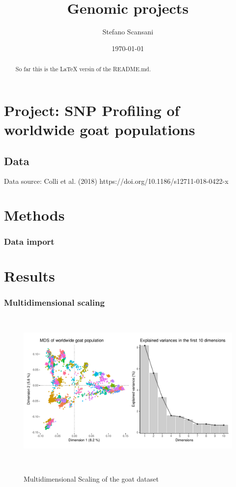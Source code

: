 \documentclass[a4paper,onecolumn,10pt]{article}
\begin{document}
\title{Genomic projects}
\author{Stefano Scansani}
\date{\today}
\maketitle
\begin{abstract}

    So far this is the \LaTeX{} versin of the README.md.

\end{abstract}
\tableofcontents
\listoffigures
\listoftables

%


\section{Project: SNP Profiling of worldwide goat populations}

\subsection{Data}

Data source: Colli et al. (2018)
https://doi.org/10.1186/s12711-018-0422-x

\section{Methods}

\subsubsection{Data import}

\section{Results}

\subsubsection{Multidimensional scaling}
\begin{figure}
    \centering
    \includegraphics[height=8cm]{../Figures/goat_mds.pdf}
    \label{fig:gwas_pop_PCA}
    \caption{Multidimensional Scaling of the goat dataset}
\end{figure}
\end{document}
